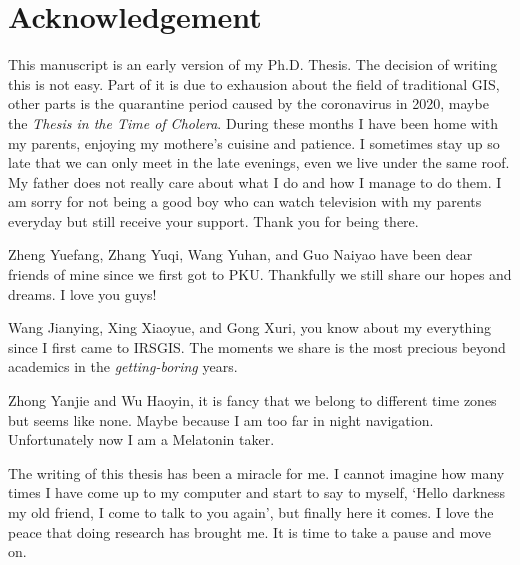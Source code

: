 \chapter*{Acknowledgement}

This manuscript is an early version of my Ph.D. Thesis. The decision of writing this is not easy. Part of it is due to exhausion about the field of traditional GIS, other parts is the quarantine period caused by the coronavirus in 2020, maybe the \textit{Thesis in the Time of Cholera}. During these months I have been home with my parents, enjoying my mothere's cuisine and patience. I sometimes stay up so late that we can only meet in the late evenings, even we live under the same roof. My father does not really care about what I do and how I manage to do them. I am sorry for not being a good boy who can watch television with my parents everyday but still receive your support. Thank you for being there.

Zheng Yuefang, Zhang Yuqi, Wang Yuhan, and Guo Naiyao have been dear friends of mine since we first got to PKU. Thankfully we still share our hopes and dreams. I love you guys!

Wang Jianying, Xing Xiaoyue, and Gong Xuri, you know about my everything since I first came to IRSGIS. The moments we share is the most precious beyond academics in the \textit{getting-boring} years. 

Zhong Yanjie and Wu Haoyin, it is fancy that we belong to different time zones but seems like none. Maybe because I am too far in night navigation. Unfortunately now I am a Melatonin taker.

The writing of this thesis has been a miracle for me. I cannot imagine how many times I have come up to my computer and start to say to myself, `Hello darkness my old friend, I come to talk to you again', but finally here it comes. I love the peace that doing research has brought me. It is time to take a pause and move on.
